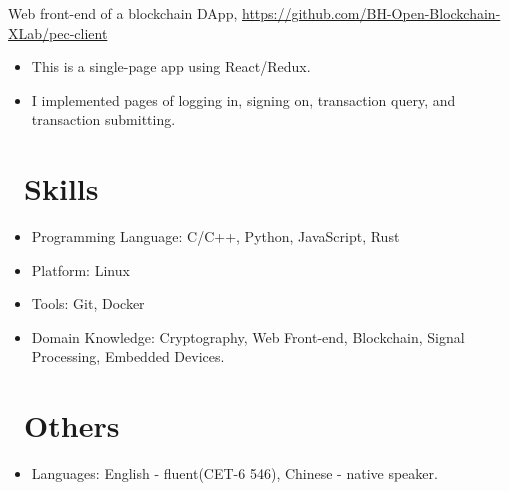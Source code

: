 \documentclass{resume}
\newcommand{\hlink}[1]{\href{#1}{#1}}
\begin{document}
\begin{onehalfspacing}
Web front-end of a blockchain DApp, \hlink{https://github.com/BH-Open-Blockchain-XLab/pec-client}
\begin{itemize}
  \item This is a single-page app using React/Redux.
  \item I implemented pages of logging in, signing on, transaction query, and transaction submitting.
\end{itemize}
\end{onehalfspacing}


\section{\faCogs\ Skills}
\begin{itemize}[parsep=0.5ex]
  \item Programming Language: C/C++, Python, JavaScript, Rust
  \item Platform: Linux
  \item Tools: Git, Docker
  \item Domain Knowledge: Cryptography, Web Front-end, Blockchain, Signal Processing, Embedded Devices.
\end{itemize}

\section{\faInfo\ Others}
\begin{itemize}[parsep=0.5ex]
  \item Languages: English - fluent(CET-6 546), Chinese - native speaker.
\end{itemize}
\end{document}
